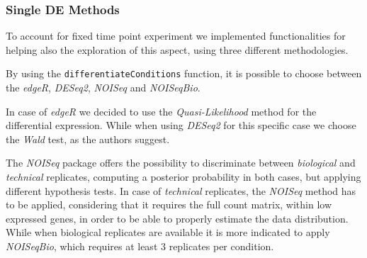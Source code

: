 %


\subsubsection{Single DE Methods}

To account for fixed time point experiment we implemented functionalities for helping also the exploration of this aspect, using three different methodologies.
 

By using the \lstinline!differentiateConditions! function, it is possible to choose between the \textit{edgeR}, \textit{DESeq2}, \textit{NOISeq} and \textit{NOISeqBio}.

In case of \textit{edgeR} we decided to use the \textit{Quasi-Likelihood} method for the differential expression.
While when using \textit{DESeq2} for this specific case we choose the \textit{Wald} test, as the authors suggest.

The \textit{NOISeq} package offers the possibility to discriminate between \textit{biological} and \textit{technical} replicates, computing a posterior probability in both cases, but applying different hypothesis tests.
In case of \textit{technical} replicates, the \textit{NOISeq} method has to be applied, considering that it requires the full count matrix, within low expressed genes, in order to be able to properly estimate the data distribution.
While when biological replicates are available it is more indicated to apply \textit{NOISeqBio}, which requires at least 3 replicates per condition.



